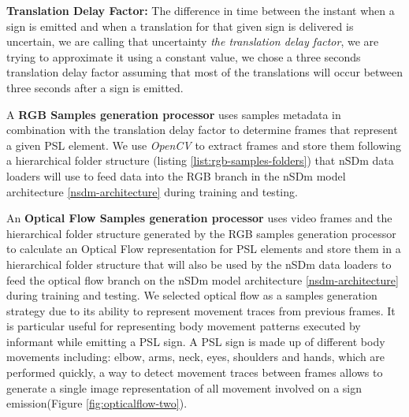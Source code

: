 \documentclass[twocolumn,conference]{article}
\begin{document}
\textbf{Translation Delay Factor: } The difference in time between the instant when a sign is emitted and when a translation for that given sign is delivered is uncertain, we are calling that uncertainty \textit{the translation delay factor}, we are trying to approximate it using a constant value, we chose a three seconds translation delay factor assuming that most of the translations will occur between three seconds after a sign is emitted.

A \textbf{RGB Samples generation processor} uses samples metadata in combination with the translation delay factor to determine frames that represent a given PSL element. We use \textit{OpenCV} to extract frames and store them following a hierarchical folder structure (listing \ref{list:rgb-samples-folders}) that nSDm data loaders will use to feed data into the RGB branch in the nSDm model architecture \ref{nsdm-architecture} during training and testing.

An \textbf{Optical Flow Samples generation processor} uses video frames and the hierarchical folder structure generated by the RGB samples generation processor to calculate an Optical Flow representation for PSL elements and store them in a hierarchical folder structure that will also be used by the nSDm data loaders to feed the optical flow branch on the nSDm model architecture \ref{nsdm-architecture} during training and testing. We selected optical flow as a samples generation strategy due to its ability to represent movement traces from previous frames. It is particular useful for representing body movement patterns executed by informant while emitting a PSL sign. A PSL sign is made up of different body movements including: elbow, arms, neck, eyes, shoulders and hands, which are performed quickly, a way to detect movement traces between frames allows to generate a single image representation of all movement involved on a sign emission(Figure \ref{fig:opticalflow-two}). 
\end{document}
